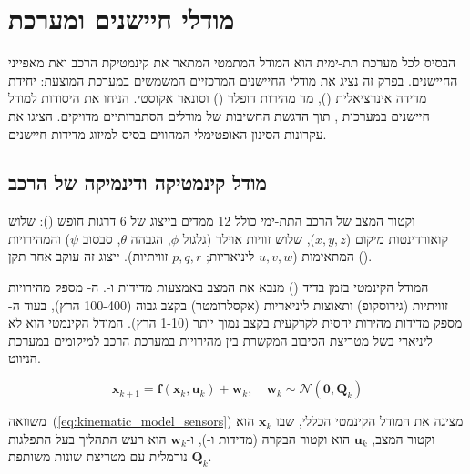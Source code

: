 
\section{מודלי חיישנים ומערכת}
\label{sec:sensors}

הבסיס לכל מערכת  תת-ימית הוא המודל המתמטי המתאר את קינמטיקת הרכב ואת מאפייני החיישנים. בפרק זה נציג את מודלי החיישנים המרכזיים המשמשים במערכת המוצעת: יחידת מדידה אינרציאלית (), מד מהירות דופלר () וסונאר אקוסטי. \citet{Thrun2005ProbRobotics} הניחו את היסודות למודל חיישנים במערכות , תוך הדגשת החשיבות של מודלים הסתברותיים מדויקים. \citet{Kalman1960} הציגו את עקרונות הסינון האופטימלי המהווים בסיס למיזוג מדידות חיישנים.

\subsection{מודל קינמטיקה ודינמיקה של הרכב}
\label{sec:vehicle_kinematics}

וקטור המצב של הרכב התת-ימי כולל 12 ממדים בייצוג של 6 דרגות חופש (): שלוש קואורדינטות מיקום ($x, y, z$), שלוש זוויות אוילר (גלגול $\phi$, הגבהה $\theta$, סבסוב $\psi$) והמהירויות המתאימות ($u, v, w$ ליניאריות; $p, q, r$ זוויתיות). ייצוג זה עוקב אחר תקן  ().

המודל הקינמטי בזמן בדיד () מנבא את המצב באמצעות מדידות  ו-. ה- מספק מהירויות זוויתיות (גירוסקופ) ותאוצות ליניאריות (אקסלרומטר) בקצב גבוה (100-400 הרץ), בעוד ה- מספק מדידות מהירות יחסית לקרקעית בקצב נמוך יותר (1-10 הרץ). המודל הקינמטי הוא לא ליניארי בשל מטריצת הסיבוב המקשרת בין מהירויות במערכת הרכב למיקומים במערכת הניווט.

\begin{equation}
\mathbf{x}_{k+1} = \mathbf{f}(\mathbf{x}_k, \mathbf{u}_k) + \mathbf{w}_k, \quad \mathbf{w}_k \sim \mathcal{N}(\mathbf{0}, \mathbf{Q}_k)
\label{eq:kinematic_model_sensors}
\end{equation}

משוואה~(\ref{eq:kinematic_model_sensors}) מציגה את המודל הקינמטי הכללי, שבו $\mathbf{x}_k$ הוא וקטור המצב, $\mathbf{u}_k$ הוא וקטור הבקרה (מדידות  ו-), ו-$\mathbf{w}_k$ הוא רעש התהליך בעל התפלגות נורמלית עם מטריצת שונות משותפת $\mathbf{Q}_k$.

